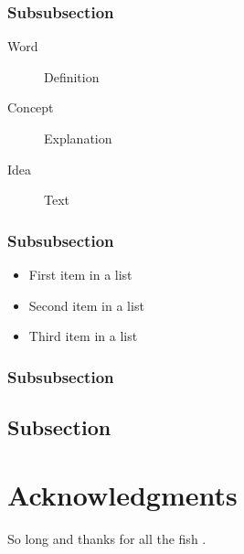 \documentclass[fleqn,10pt]{SelfArx} %
\begin{document}
\subsubsection{Subsubsection}

\lipsum[12] %

\begin{description}
\item[Word] Definition
\item[Concept] Explanation
\item[Idea] Text
\end{description}

\subsubsection{Subsubsection}

\lipsum[13] %

\begin{itemize}[noitemsep] %
\item First item in a list
\item Second item in a list
\item Third item in a list
\end{itemize}

\subsubsection{Subsubsection}

\lipsum[14] %

\subsection{Subsection}

\lipsum[15-23] %

\section*{Acknowledgments} %


So long and thanks for all the fish \cite{Figueredo:2009dg}.




\end{document}

